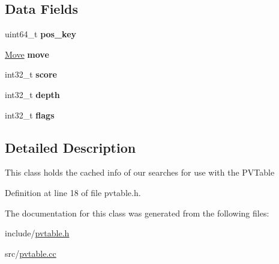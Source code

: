 \subsection*{Data Fields}
\begin{DoxyCompactItemize}
\item 
\mbox{\label{classPvEntry_ab1e717bdabc6da4bf546d0b1af252091}} 
uint64\+\_\+t {\bfseries pos\+\_\+key}
\item 
\mbox{\label{classPvEntry_a6e6ab2e38db069902f7aeb2dae727a1e}} 
\mbox{\hyperlink{classMove}{Move}} {\bfseries move}
\item 
\mbox{\label{classPvEntry_a00a4547715d4b994bf2e889e7a4b29a9}} 
int32\+\_\+t {\bfseries score}
\item 
\mbox{\label{classPvEntry_a75056e46bf9a3a8ed3955119fc83ace8}} 
int32\+\_\+t {\bfseries depth}
\item 
\mbox{\label{classPvEntry_a90d1ef7b561954f7265af72e3cdd94be}} 
int32\+\_\+t {\bfseries flags}
\end{DoxyCompactItemize}


\subsection{Detailed Description}
This class holds the cached info of our searches for use with the P\+V\+Table 

Definition at line 18 of file pvtable.\+h.



The documentation for this class was generated from the following files\+:\begin{DoxyCompactItemize}
\item 
include/\mbox{\hyperlink{pvtable_8h}{pvtable.\+h}}\item 
src/\mbox{\hyperlink{pvtable_8cc}{pvtable.\+cc}}\end{DoxyCompactItemize}
